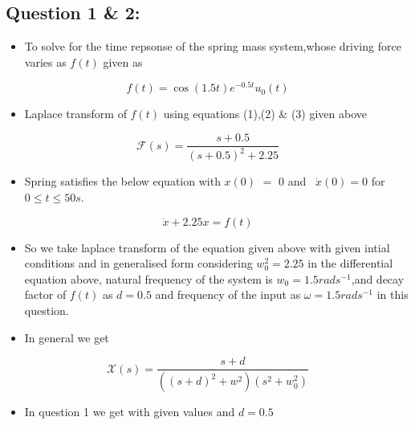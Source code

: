 \documentclass[10pt,a4paper]{article}
\providecommand{\tightlist}{%
      \setlength{\itemsep}{0pt}\setlength{\parskip}{0pt}}
\begin{document}
    \subsection{Question 1 \& 2:}\label{question-1-2}

\begin{itemize}
\tightlist
\item
  To solve for the time repsonse of the spring mass system,whose driving
  force varies as \(f(t)\) given as
\end{itemize}

\begin{equation}
f(t) = \cos(1.5t) e^{-0.5t}u_0(t)
\end{equation}

\begin{itemize}
\tightlist
\item
  Laplace transform of \(f(t)\) using equations (1),(2) \& (3) given
  above
\end{itemize}

\begin{equation}
    \mathcal{F}(s) = \frac{s+0.5}{(s+0.5)^2 + 2.25}
\end{equation}

\begin{itemize}
\tightlist
\item
  Spring satisfies the below equation with \(x(0)\) \(=\) \(0\) and
  \ $\dot x(0) = 0$ for  $ 0 \leq t \leq 50s $.
\end{itemize}

\begin{equation}
\ddot x + 2.25x = f(t)
\end{equation}

\begin{itemize}
\item
  So we take laplace transform of the equation given above with given
  intial conditions and in generalised form considering
  $w_{0}^{2} = 2.25 $ in the differential equation above,
  natural frequency of the system is \(w_0 = 1.5 rads^{-1}\),and decay
  factor of \(f(t)\) as \(d = 0.5\) and frequency of the input as
  $\omega = 1.5 rads^{-1}$ in this question.
\item
  In general we get
\end{itemize}

\begin{equation}
    \mathcal{X}(s) = \frac{s+d}{((s+d)^2 + w^2)(s^2 + w_{0}^{2})}
\end{equation}

\begin{itemize}
\tightlist
\item
  In question 1 we get with given values and \(d = 0.5\)
\end{itemize}
\end{document}
